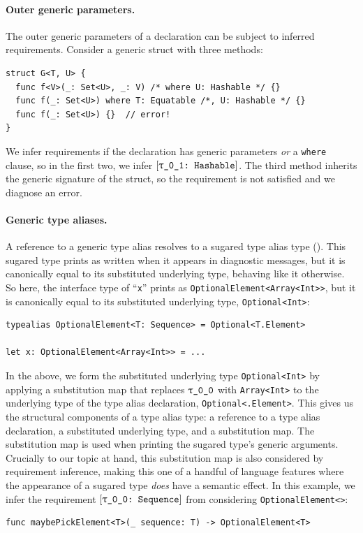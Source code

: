 \documentclass[../generics]{subfiles}
\begin{document}
\paragraph{Outer generic parameters.}
The outer generic parameters of a declaration can be subject to inferred requirements. Consider a generic struct with three methods:
\begin{Verbatim}
struct G<T, U> {
  func f<V>(_: Set<U>, _: V) /* where U: Hashable */ {}
  func f(_: Set<U>) where T: Equatable /*, U: Hashable */ {}
  func f(_: Set<U>) {}  // error!
}
\end{Verbatim}
We infer requirements if the declaration has generic parameters \emph{or} a \texttt{where} clause, so in the first two, we infer $\ConfReq{\rU}{Hashable}$. The third method inherits the generic signature of the struct, so the requirement is not satisfied and we diagnose an error.

\paragraph{Generic type aliases.}
A reference to a generic type alias resolves to a sugared type alias type (). This sugared type prints as written when it appears in diagnostic messages, but it is canonically equal to its substituted underlying type, behaving like it otherwise. So here, the interface type of ``\texttt{x}'' prints as \texttt{OptionalElement<Array<Int>>}, but it is canonically equal to its substituted underlying type, \texttt{Optional<Int>}:
\begin{Verbatim}
typealias OptionalElement<T: Sequence> = Optional<T.Element>

let x: OptionalElement<Array<Int>> = ...
\end{Verbatim}

In the above, we form the substituted underlying type \texttt{Optional<Int>} by applying a substitution map that replaces $\rT$ with \texttt{Array<Int>} to the underlying type of the type alias declaration, \texttt{Optional<\rT.Element>}. This gives us the structural components of a type alias type: a reference to a type alias declaration, a substituted underlying type, and a substitution map. The substitution map is used when printing the sugared type's generic arguments. Crucially to our topic at hand, this substitution map is also considered by requirement inference, making this one of a handful of language features where the appearance of a sugared type \emph{does} have a semantic effect. In this example, we infer the requirement $\rTSequence$ from considering \texttt{OptionalElement<\rT>}:
\begin{Verbatim}
func maybePickElement<T>(_ sequence: T) -> OptionalElement<T>
\end{Verbatim}
\end{document}
